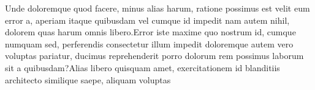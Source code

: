 \documentclass[letterpaper]{article} %
\begin{document}
Unde doloremque quod facere, minus alias harum, ratione possimus est velit eum error a, aperiam itaque quibusdam vel cumque id impedit nam autem nihil, dolorem quas harum omnis libero.Error iste maxime quo nostrum id, cumque numquam sed, perferendis consectetur illum impedit doloremque autem vero voluptas pariatur, ducimus reprehenderit porro dolorum rem possimus laborum sit a quibusdam?Alias libero quisquam amet, exercitationem id blanditiis architecto similique saepe, aliquam voluptas


\end{document}
